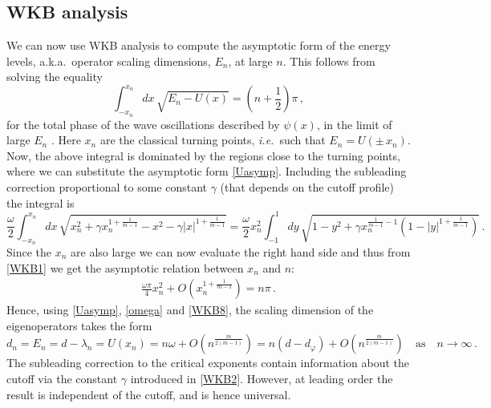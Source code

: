 \documentclass[11pt,a4paper]{article}
\numberwithin{figure}{section}
\numberwithin{equation}{section}
\newcommand{\be}{\begin{equation}}
\newcommand{\ee}{\end{equation}}
\newcommand\ie{\textit{i.e.}\ }
\newcommand{\aka}{{a.k.a.}\ }
\newcommand{\ph}{\varphi}
\begin{document}
\subsection{WKB analysis}
We can now use WKB analysis to compute the asymptotic form of the energy levels, \aka operator scaling dimensions, $E_n$, at large $n$. This follows from  solving the equality
\begin{equation} \label{WKB1}
    \int_{-x_n}^{x_n}\!\!\!\! dx\, \sqrt{E_n - U(x)} = \left( n + \frac{1}{2} \right) \pi \,,
\end{equation}
for the total phase of the wave oscillations described by $\psi(x)$,
in the limit of large $E_n$ \cite{morse1953methods}. Here $x_n$ are the classical turning points, \ie such that $E_n = U(\pm \, x_n)$. Now, the above integral is dominated by the regions close to the turning points, where 
we can substitute the asymptotic form  \eqref{Uasymp}. Including the subleading correction proportional to some constant $\gamma$ (that depends on the cutoff profile) the integral is
\begin{equation} \label{WKB2}
    \frac{\omega}{2} \int_{-x_n}^{x_n}\!\!\!\! dx\, \sqrt{x_n^2 + \gamma x_n^{1 + \frac{1}{m-1}} - x^2 - \gamma |x|^{1 + \frac{1}{m-1}}} = 
    \frac{\omega}{2}x^2_n \int_{-1}^{1}\!\!\!\! dy\,\sqrt{1-y^2+\gamma x_n^{\frac{1}{m-1}-1}(1-|y|^{1+ \frac{1}{m-1}})} \,.
\end{equation}
Since the $x_n$ are also large we can now evaluate the right hand side and thus from \eqref{WKB1} we get the asymptotic relation between $x_n$ and $n$:
\begin{align}
    \frac{\omega \pi}{4} x_n^2 + O\left( x_n^{1+\frac{1}{m-1}} \right) = n \pi\,. \label{WKB8}
\end{align}
Hence, using \eqref{Uasymp}, \eqref{omega} and \eqref{WKB8}, the scaling dimension of the eigenoperators takes the form
\be 
\label{largen}
d_n=E_n=d-\lambda_n=U(x_n) = n\omega + O\left( n^\frac{m}{2(m-1)} \right) = n(d-d_\ph) + O\left( n^\frac{m}{2(m-1)} \right) \quad \text{as} \quad n \rightarrow \infty \,.
\ee
The subleading correction to the critical exponents contain information about the cutoff via the constant $\gamma$ introduced in \eqref{WKB2}. However, at leading order the result is independent of the cutoff, and is hence universal.
\end{document}
